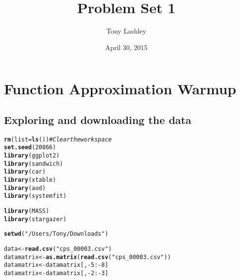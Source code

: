 \documentclass{article}\usepackage[]{graphicx}\usepackage[]{color}
\title{Problem Set 1}
\author{Tony Lashley}
\date{April 30, 2015}
\makeatletter
\newcommand{\hlnum}[1]{\textcolor[rgb]{0.686,0.059,0.569}{#1}}%
\newcommand{\hlstr}[1]{\textcolor[rgb]{0.192,0.494,0.8}{#1}}%
\newcommand{\hlcom}[1]{\textcolor[rgb]{0.678,0.584,0.686}{\textit{#1}}}%
\newcommand{\hlopt}[1]{\textcolor[rgb]{0,0,0}{#1}}%
\newcommand{\hlstd}[1]{\textcolor[rgb]{0.345,0.345,0.345}{#1}}%
\newcommand{\hlkwb}[1]{\textcolor[rgb]{0.69,0.353,0.396}{#1}}%
\newcommand{\hlkwc}[1]{\textcolor[rgb]{0.333,0.667,0.333}{#1}}%
\newcommand{\hlkwd}[1]{\textcolor[rgb]{0.737,0.353,0.396}{\textbf{#1}}}%
\newenvironment{kframe}{%
 \def\at@end@of@kframe{}%
 \ifinner\ifhmode%
  \def\at@end@of@kframe{\end{minipage}}%
  \begin{minipage}{\columnwidth}%
 \fi\fi%
 \def\FrameCommand##1{\hskip\@totalleftmargin \hskip-\fboxsep
 \colorbox{shadecolor}{##1}\hskip-\fboxsep
     \hskip-\linewidth \hskip-\@totalleftmargin \hskip\columnwidth}%
 \MakeFramed {\advance\hsize-\width
   \@totalleftmargin\z@ \linewidth\hsize
   \@setminipage}}%
 {\par\unskip\endMakeFramed%
 \at@end@of@kframe}
\newenvironment{knitrout}{}{} %
\makeatother
\begin{document}
\section{Function Approximation Warmup}
\subsection{Exploring and downloading the data}

\begin{knitrout}
\color{fgcolor}\begin{kframe}
\begin{alltt}
\hlkwd{rm}\hlstd{(}\hlkwc{list}\hlstd{=}\hlkwd{ls}\hlstd{())}           \hlcom{# Clear the workspace}
\hlkwd{set.seed}\hlstd{(}\hlnum{20866}\hlstd{)}
\hlkwd{library}\hlstd{(ggplot2)}
\hlkwd{library}\hlstd{(sandwich)}
\hlkwd{library}\hlstd{(car)}
\hlkwd{library}\hlstd{(xtable)}
\hlkwd{library}\hlstd{(aod)}
\hlkwd{library}\hlstd{(systemfit)}
\end{alltt}


{\ttfamily\noindent\itshape\color{messagecolor}{\#\# Loading required package: Matrix\\\#\# Loading required package: lmtest\\\#\# Loading required package: zoo\\\#\# \\\#\# Attaching package: 'zoo'\\\#\# \\\#\# The following objects are masked from 'package:base':\\\#\# \\\#\#\ \ \ \  as.Date, as.Date.numeric}}\begin{alltt}
\hlkwd{library}\hlstd{(MASS)}
\hlkwd{library}\hlstd{(stargazer)}
\end{alltt}


{\ttfamily\noindent\itshape\color{messagecolor}{\#\# \\\#\# Please cite as: \\\#\# \\\#\#\ \ Hlavac, Marek (2014). stargazer: LaTeX code and ASCII text for well-formatted regression and summary statistics tables.\\\#\#\ \ R package version 5.1. http://CRAN.R-project.org/package=stargazer}}\begin{alltt}
\hlkwd{setwd}\hlstd{(}\hlstr{"/Users/Tony/Downloads"}\hlstd{)}

\hlstd{data} \hlkwb{<-} \hlkwd{read.csv}\hlstd{(}\hlstr{"cps_00003.csv"}\hlstd{)}
\hlstd{datamatrix} \hlkwb{<-} \hlkwd{as.matrix}\hlstd{(}\hlkwd{read.csv}\hlstd{(}\hlstr{"cps_00003.csv"}\hlstd{))}
\hlstd{datamatrix} \hlkwb{<-} \hlstd{datamatrix[,}\hlopt{-}\hlnum{5}\hlopt{:-}\hlnum{8}\hlstd{]}
\hlstd{datamatrix} \hlkwb{<-} \hlstd{datamatrix[,}\hlopt{-}\hlnum{2}\hlopt{:-}\hlnum{3}\hlstd{]}


\end{alltt}
\end{kframe}
\end{knitrout}
\end{document}
